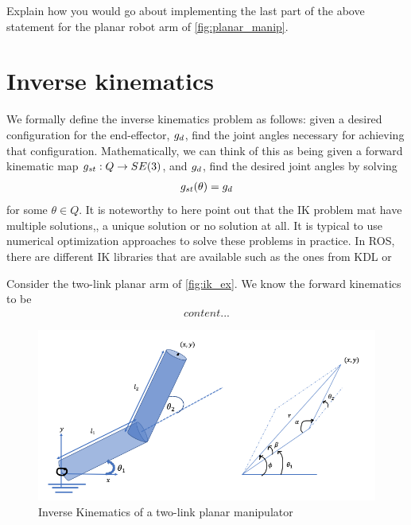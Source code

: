 \begin{homework}
	Explain how you would go about implementing the last part of the above statement for the planar robot arm of \autoref{fig:planar_manip}.
\end{homework}

\section{Inverse kinematics}
%
We formally define the inverse kinematics problem as follows: given a desired configuration for the end-effector, $g_d$, find the joint angles necessary for achieving that configuration. Mathematically, we can think of this as being given a forward kinematic map $g_{st}: Q \rightarrow SE(3)$, and $g_d$, find the desired joint angles by solving 
%
\begin{align}
	g_{st}(\theta) = g_d
\end{align}
%
for some $\theta \in Q$. It is noteworthy to here point out that the IK problem mat have multiple solutions,, a unique solution or no solution at all. It is typical to use numerical optimization approaches to solve these problems in practice. In ROS, there are different IK libraries that are available such as the ones from \textsc{KDL} or 

\begin{example}
	Consider the two-link planar arm of \autoref{fig:ik_ex}. We know the forward kinematics to be 
	\begin{align}
		content...
	\end{align}
\end{example}

\begin{figure}[tb!]
	\centering
	\includegraphics[width=.8\columnwidth]{figures/ik_ex.png}
	\caption{Inverse Kinematics of a two-link planar manipulator}
	\label{fig:ik_ex}
\end{figure}